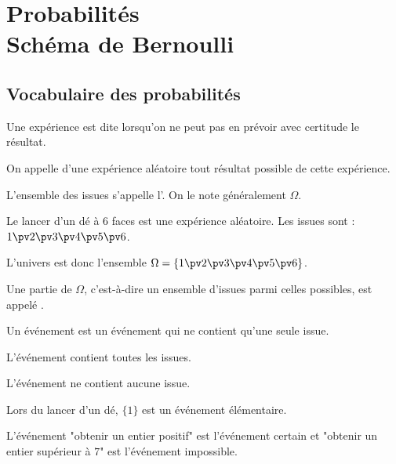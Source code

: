 \documentclass[10pt,openright,twoside,french]{book}
\begin{document}
\chapter[Schéma de Bernoulli]{Probabilités \\ Schéma de Bernoulli}\label{schema_bernoulli}

\section{Vocabulaire des probabilités}

\begin{Defi}
    Une expérience est dite  lorsqu'on ne peut pas en prévoir avec certitude le résultat.\par
    On appelle  d'une expérience aléatoire tout résultat possible de cette expérience.\par
    L'ensemble des issues s'appelle l'. On le note généralement $\Omega$.
\end{Defi}

\begin{Exemple}
    Le lancer d'un dé à 6 faces est une expérience aléatoire. Les issues sont : $1\pv 2\pv 3\pv 4\pv 5\pv 6$.\par
    L'univers est donc l'ensemble $\Omega = \{1\pv 2\pv 3\pv 4\pv 5\pv 6\}$.
\end{Exemple}

\begin{Defi}
    Une partie de $\Omega$, c'est-à-dire un ensemble d'issues parmi celles possibles, est appelé .\par
    Un événement  est un événement qui ne contient qu'une seule issue.\par
    L'événement  contient toutes les issues.\par
    L'événement  ne contient aucune issue.
\end{Defi}

\begin{Exemple}
    Lors du lancer d'un dé, $\{1\}$ est un événement élémentaire.\par
    L'événement "obtenir un entier positif" est l'événement certain et "obtenir un entier supérieur à $7$" est l'événement impossible.
\end{Exemple}
\end{document}
